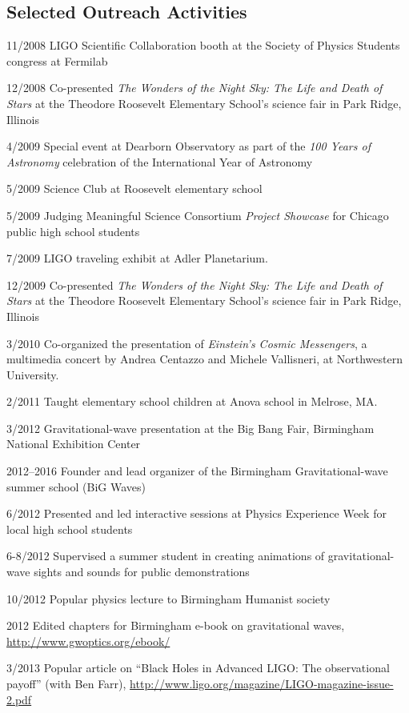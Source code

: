 \documentclass[margin,line]{res}
\begin{document}
\begin{resume}
\newpage

\section{\sc Selected Outreach Activities}
11/2008 	LIGO Scientific Collaboration booth at the Society of Physics Students congress at Fermilab

12/2008 	Co-presented {\it The Wonders of the Night Sky: The Life and Death of Stars} at the Theodore Roosevelt Elementary School's science fair in Park Ridge, Illinois

4/2009 	Special event at Dearborn Observatory as part of the {\it 100 Years of Astronomy} celebration of the International Year of Astronomy

5/2009	Science Club at Roosevelt elementary school

5/2009	Judging Meaningful Science Consortium {\it Project Showcase} for Chicago public high school students

7/2009 	 LIGO traveling exhibit at Adler Planetarium. 

12/2009 	Co-presented {\it The Wonders of the Night Sky: The Life and Death of Stars} at the Theodore Roosevelt Elementary School's science fair in Park Ridge, Illinois

3/2010  	Co-organized the presentation of {\it Einstein's Cosmic Messengers}, a multimedia concert by Andrea Centazzo and Michele Vallisneri, at Northwestern University.

2/2011	Taught elementary school children at Anova school in Melrose, MA.

3/2012	Gravitational-wave presentation at the Big Bang Fair, Birmingham National Exhibition Center

2012--2016	Founder and lead organizer of the Birmingham Gravitational-wave summer school (BiG Waves)

6/2012	Presented and led interactive sessions at Physics Experience Week for local high school students

6-8/2012	Supervised a summer student in creating animations of gravitational-wave sights and sounds for public demonstrations

10/2012	Popular physics lecture to Birmingham Humanist society

2012		Edited chapters for Birmingham e-book on gravitational waves, \url{http://www.gwoptics.org/ebook/}
	  
3/2013	Popular article on ``Black Holes in Advanced LIGO: The observational payoff'' (with Ben Farr), \url{http://www.ligo.org/magazine/LIGO-magazine-issue-2.pdf}


\end{resume}
\end{document}
